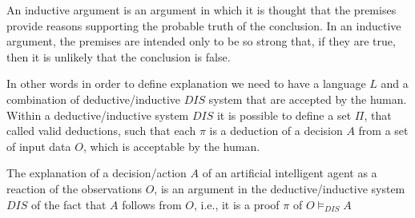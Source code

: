 An inductive argument is an argument in which it is thought that the
premises provide reasons supporting the probable truth of the
conclusion. In an inductive argument, the premises are intended only
to be so strong that, if they are true, then it is unlikely that the
conclusion is false.

In other words in order to define explanation we need to have a
language $L$ and a combination of deductive/inductive $DIS$ system
that are accepted by the human. Within a deductive/inductive system
$DIS$ it is possible to define a set $\Pi$, that called valid
deductions, such that each $\pi$ is a deduction of a decision $A$ from
a set of input data $O$, which is acceptable by the human.

\begin{definition}[Explanation]
  The explanation of a decision/action $A$ of an artificial
  intelligent agent as a reaction of the observations 
  $O$, is an argument in the deductive/inductive system $DIS$
  of the fact that $A$ follows from $O$, i.e., it is a proof $\pi$ of
  $O\models_{DIS} A$
\end{definition}

